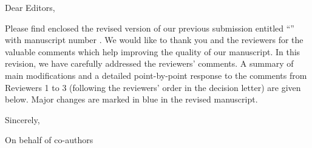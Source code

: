 Dear Editors,

Please find enclosed the revised version of our previous submission entitled \enquote{\printtitle} with manuscript number \printmanuscript.
We would like to thank you and the reviewers for the valuable comments which help improving the quality of our manuscript.
In this revision, we have carefully addressed the reviewers' comments.
A summary of main modifications and a detailed point-by-point response to the comments from Reviewers 1 to 3 (following the reviewers' order in the decision letter) are given below.
Major changes are marked in {\color{colorrevfg}blue} in the revised manuscript.

\vspace{1.2em}

Sincerely,

\vspace{1.7em}

\printauthor

On behalf of co-authors
